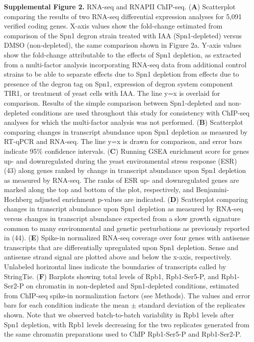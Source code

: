 \documentclass[8pt]{extarticle}
\begin{document}
\vspace{2em}
\textbf{Supplemental Figure 2.} RNA-seq and RNAPII ChIP-seq.
(\textbf{A}) Scatterplot comparing the results of two RNA-seq differential expression analyses for 5,091 verified coding genes.
X-axis values show the fold-change estimated from comparison of the Spn1 degron strain treated with IAA (Spn1-depleted) versus DMSO (non-depleted), the same comparison shown in Figure 2a.
Y-axis values show the fold-change attributable to the effects of Spn1 depletion, as extracted from a multi-factor analysis incorporating RNA-seq data from additional control strains to be able to separate effects due to Spn1 depletion from effects due to presence of the degron tag on Spn1, expression of degron system component TIR1, or treatment of yeast cells with IAA.
The line y=x is overlaid for comparison.
Results of the simple comparison between Spn1-depleted and non-depleted conditions are used throughout this study for consistency with ChIP-seq analyses for which the multi-factor analysis was not performed.
(\textbf{B}) Scatterplot comparing changes in transcript abundance upon Spn1 depletion as measured by RT-qPCR and RNA-seq. The line y=x is drawn for comparison, and error bars indicate 95\% confidence intervals.
(\textbf{C}) Running GSEA enrichment score for genes up- and downregulated during the yeast environmental stress response (ESR) (43) along genes ranked by change in transcript abundance upon Spn1 depletion as measured by RNA-seq.
The ranks of ESR up- and downregulated genes are marked along the top and bottom of the plot, respectively, and Benjamini-Hochberg adjusted enrichment p-values are indicated.
(\textbf{D}) Scatterplot comparing changes in transcript abundance upon Spn1 depletion as measured by RNA-seq versus changes in transcript abundance expected from a slow growth signature common to many environmental and genetic perturbations as previously reported in (44).
(\textbf{E}) Spike-in normalized RNA-seq coverage over four genes with antisense transcripts that are differentially upregulated upon Spn1 depletion.
Sense and antisense strand signal are plotted above and below the x-axis, respectively.
Unlabeled horizontal lines indicate the boundaries of transcripts called by StringTie.
(\textbf{F}) Barplots showing total levels of Rpb1, Rpb1-Ser5-P, and Rpb1-Ser2-P on chromatin in non-depleted and Spn1-depleted conditions, estimated from ChIP-seq spike-in normalization factors (see Methods).
The values and error bars for each condition indicate the mean $\pm$ standard deviation of the replicates shown.
Note that we observed batch-to-batch variability in Rpb1 levels after Spn1 depletion, with Rpb1 levels decreasing for the two replicates generated from the same chromatin preparations used to ChIP Rpb1-Ser5-P and Rpb1-Ser2-P.
\end{document}
